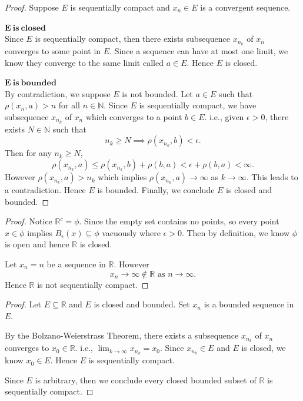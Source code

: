 \begin{Exercise}
\begin{enumerate}[a)]
\item
\begin{proof}
Suppose $E$ is sequentially compact and $x_n \in E$ is a convergent sequence.
\item [$\mathbf{E\ is\ closed}$] ~\\
Since $E$ is sequentially compact, then there exists subsequence $x_{n_k}$ of $x_n$ converges to some point in $E$. Since a sequence can have at most one limit, we know they converge to the same limit called $a\in E$. Hence $E$ is closed.
\item [$\mathbf{E\ is\ bounded}$] ~\\
By contradiction, we suppose $E$ is not bounded. Let $a\in E$ such that $\rho(x_n, a) > n$ for all $n\in\mathbb{N}$. Since $E$ is sequentially compact, we have subsequence $x_{n_k}$ of $x_n$ which converges to a point $b\in E$. i.e., given $\epsilon > 0$, there exists $N\in\mathbb{N}$ such that
$$
n_k\geq N \implies \rho(x_{n_k}, b) < \epsilon.
$$
Then for any $n_k \geq N$,
$$
\rho(x_{n_k}, a)
\leq \rho(x_{n_k}, b) + \rho(b, a)
< \epsilon + \rho(b,a)
< \infty.
$$
However $\rho(x_{n_k}, a) > n_k$ which implies $\rho(x_{n_k}, a)\to\infty$ as $k\to\infty$. This leads to a contradiction. Hence $E$ is bounded.
Finally, we conclude $E$ is closed and bounded.
\end{proof}

\item
\begin{proof}
Notice $\mathbb{R}^c = \phi$. Since the empty set contains no points, so every point $x\in\phi$ implies $B_{\epsilon}(x) \subseteq \phi$ vacuously where $\epsilon>0$. Then by definition, we know $\phi$ is open and hence $\mathbb{R}$ is closed.

Let $x_n = n$ be a sequence in $\mathbb{R}$. However $$x_n \to\infty\notin\mathbb{R}\text{ as } n\to\infty.$$
Hence $\mathbb{R}$ is not sequentially compact.
\end{proof}

\item
\begin{proof}
Let $E \subseteq \mathbb{R}$ and $E$ is closed and bounded. Set $x_n$ is a bounded sequence in $E$.

By the Bolzano-Weierstrass Theorem, there exists a subsequence $x_{n_k}$ of $x_n$ converges to $x_0 \in \mathbb{R}$. i.e., $\lim_{k\to\infty}x_{n_k} = x_0$. Since $x_{n_k} \in E$ and $E$ is closed, we know $x_0\in E$. Hence $E$ is sequentially compact. 

Since $E$ is arbitrary, then we conclude every closed bounded subset of $\mathbb{R}$ is sequentially compact.
\end{proof}
\end{enumerate}
\end{Exercise}